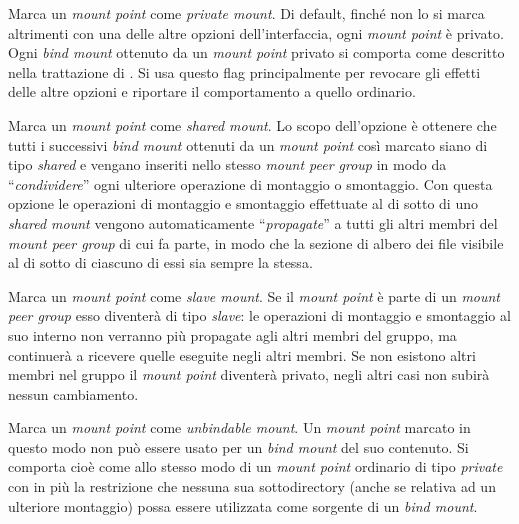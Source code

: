 \begin{basedescript}{\desclabelwidth{1.9cm}\desclabelstyle{\nextlinelabel}}

\item[\constd{MS\_PRIVATE}] Marca un \textit{mount point} come \textit{private
    mount}.  Di default, finché non lo si marca altrimenti con una delle altre
  opzioni dell'interfaccia, ogni \textit{mount point} è privato. Ogni
  \textit{bind mount} ottenuto da un \textit{mount point} privato si comporta
  come descritto nella trattazione di . Si usa questo flag
  principalmente per revocare gli effetti delle altre opzioni e riportare il
  comportamento a quello ordinario.

\item[\constd{MS\_SHARED}] Marca un \textit{mount point} come \textit{shared
    mount}.  Lo scopo dell'opzione è ottenere che tutti i successivi
  \textit{bind mount} ottenuti da un \textit{mount point} così marcato siano
  di tipo \textit{shared} e vengano inseriti nello stesso \textit{mount peer
    group} in modo da ``\textsl{condividere}'' ogni ulteriore operazione di
  montaggio o smontaggio. Con questa opzione le operazioni di montaggio e
  smontaggio effettuate al di sotto di uno \textit{shared mount} vengono
  automaticamente ``\textsl{propagate}'' a tutti gli altri membri del
  \textit{mount peer group} di cui fa parte, in modo che la sezione di albero
  dei file visibile al di sotto di ciascuno di essi sia sempre la stessa.

\item[\constd{MS\_SLAVE}] Marca un \textit{mount point} come \textit{slave
    mount}. Se il \textit{mount point} è parte di un \textit{mount peer group}
  esso diventerà di tipo \textit{slave}: le operazioni di montaggio e
  smontaggio al suo interno non verranno più propagate agli altri membri del
  gruppo, ma continuerà a ricevere quelle eseguite negli altri membri. Se non
  esistono altri membri nel gruppo il \textit{mount point} diventerà privato,
  negli altri casi non subirà nessun cambiamento.

\item[\constd{MS\_UNBINDABLE}] Marca un \textit{mount point} come
  \textit{unbindable mount}.  Un \textit{mount point} marcato in questo modo
  non può essere usato per un \textit{bind mount} del suo contenuto. Si
  comporta cioè come allo stesso modo di un \textit{mount point} ordinario di
  tipo \textit{private} con in più la restrizione che nessuna sua
  sottodirectory (anche se relativa ad un ulteriore montaggio) possa essere
  utilizzata come sorgente di un \textit{bind mount}.
  
\end{basedescript}

